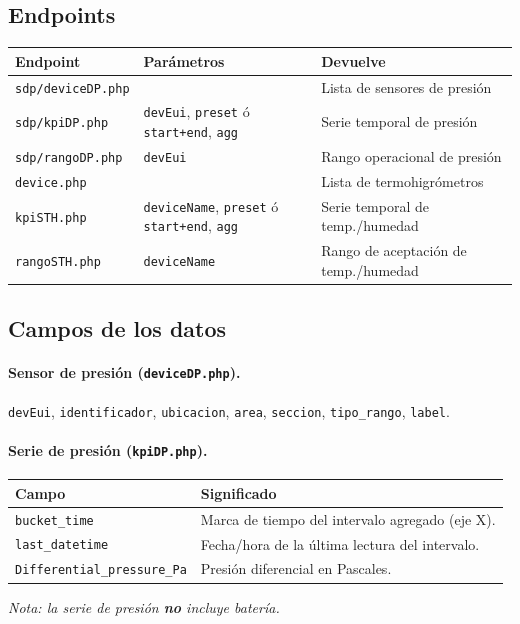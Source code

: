 \documentclass[11pt,a4paper]{article}
\newcommand{\code}[1]{\texttt{\small #1}}
\begin{document}
\subsection{Endpoints}
\begin{center}
\begin{longtable}{@{}p{4.1cm}p{4.0cm}p{6.3cm}@{}}
\toprule
\textbf{Endpoint} & \textbf{Parámetros} & \textbf{Devuelve} \\
\midrule
\endhead
\code{sdp/deviceDP.php} & \textemdash{} & Lista de sensores de presión \\
\code{sdp/kpiDP.php} & \code{devEui}, \code{preset} ó \code{start+end}, \code{agg} & Serie temporal de presión \\
\code{sdp/rangoDP.php} & \code{devEui} & Rango operacional de presión \\
\code{device.php} & \textemdash{} & Lista de termohigrómetros \\
\code{kpiSTH.php} & \code{deviceName}, \code{preset} ó \code{start+end}, \code{agg} & Serie temporal de temp./humedad \\
\code{rangoSTH.php} & \code{deviceName} & Rango de aceptación de temp./humedad \\
\bottomrule
\end{longtable}
\end{center}

\subsection{Campos de los datos}

\paragraph{Sensor de presión (\code{deviceDP.php}).}
\code{devEui}, \code{identificador}, \code{ubicacion}, \code{area}, \code{seccion},
\code{tipo\_rango}, \code{label}.

\paragraph{Serie de presión (\code{kpiDP.php}).}
\begin{center}
\begin{tabular}{@{}p{4.8cm}p{9.6cm}@{}}
\toprule
\textbf{Campo} & \textbf{Significado} \\
\midrule
\code{bucket\_time} & Marca de tiempo del intervalo agregado (eje X). \\
\code{last\_datetime} & Fecha/hora de la última lectura del intervalo. \\
\code{Differential\_pressure\_Pa} & Presión diferencial en Pascales. \\
\bottomrule
\end{tabular}
\end{center}
\noindent\textit{Nota: la serie de presión \textbf{no} incluye batería.}
\end{document}
